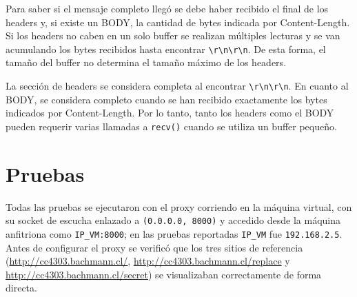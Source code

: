 \documentclass[
	spanish, %
	letterpaper, oneside
]{article}
\newcommand{\code}[1]{\texttt{#1}}    %
\newcommand{\hdr}[1]{#1}              %
\begin{document}
Para saber si el mensaje completo llegó se debe haber recibido el final de los headers y, si existe un BODY, la cantidad de bytes indicada por \hdr{Content-Length}. Si los headers no caben en un solo buffer se realizan múltiples lecturas y se van acumulando los bytes recibidos hasta encontrar \verb|\r\n\r\n|. De esta forma, el tamaño del buffer no determina el tamaño máximo de los headers.

La sección de headers se considera completa al encontrar \verb|\r\n\r\n|. En cuanto al BODY, se considera completo cuando se han recibido exactamente los bytes indicados por \hdr{Content-Length}. Por lo tanto, tanto los headers como el BODY pueden requerir varias llamadas a \code{recv()} cuando se utiliza un buffer pequeño.

\section{Pruebas}
Todas las pruebas se ejecutaron con el proxy corriendo en la máquina virtual, con su socket de escucha enlazado a \code{(0.0.0.0, 8000)} y accedido desde la máquina anfitriona como \code{IP\_VM:8000}; en las pruebas reportadas \code{IP\_VM} fue \code{192.168.2.5}. Antes de configurar el proxy se verificó que los tres sitios de referencia (\url{http://cc4303.bachmann.cl/}, \url{http://cc4303.bachmann.cl/replace} y \url{http://cc4303.bachmann.cl/secret}) se visualizaban correctamente de forma directa.
\end{document}
